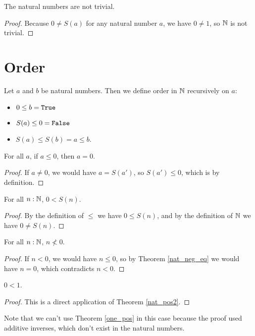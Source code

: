 \documentclass[../math.tex]{subfiles}
\begin{document}
\begin{instance}
    The natural numbers are not trivial.
\end{instance}
\begin{proof}
    Because $0 \neq S(a)$ for any natural number $a$, we have $0 \neq 1$, so
    $\mathbb{N}$ is not trivial.
\end{proof}

\section{Order}

\begin{instance}
    Let $a$ and $b$ be natural numbers.  Then we define order in $\mathbb{N}$
    recursively on $a$:
    \begin{itemize}
        \item $0 \leq b = \vtt{True}$
        \item $S(a) \leq 0 = \vtt{False}$
        \item $S(a) \leq S(b) = a \leq b$.
    \end{itemize}
\end{instance}

\begin{theorem} \label{nat_neg_eq}
    For all $a$, if $a \leq 0$, then $a = 0$.
\end{theorem}
\begin{proof}
    If $a \neq 0$, we would have $a = S(a')$, so $S(a') \leq 0$, which is
     by definition.
\end{proof}

\begin{theorem} \label{nat_pos2}
    For all $n : \mathbb{N}$, $0 < S(n)$.
\end{theorem}
\begin{proof}
    By the definition of $\leq$ we have $0 \leq S(n)$, and by the definition of
    $\mathbb{N}$ we have $0 \neq S(n)$.
\end{proof}

\begin{theorem} \label{nat_neg2}
    For all $n : \mathbb{N}$, $n \nless 0$.
\end{theorem}
\begin{proof}
    If $n < 0$, we would have $n \leq 0$, so by Theorem \ref{nat_neg_eq} we
    would have $n = 0$, which contradicts $n < 0$.
\end{proof}

\begin{theorem}
    $0 < 1$.
\end{theorem}
\begin{proof}
    This is a direct application of Theorem \ref{nat_pos2}.
\end{proof}
\noindent Note that we can't use Theorem \ref{one_pos} in this case because the
proof used additive inverses, which don't exist in the natural numbers.
\end{document}

